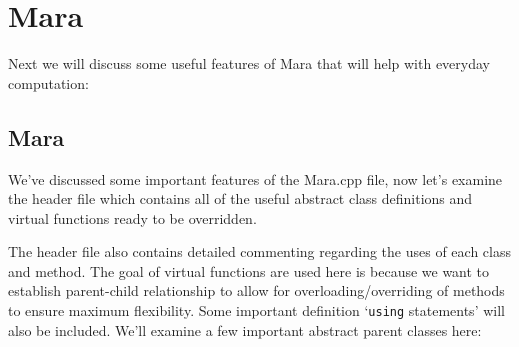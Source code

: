 \documentclass{article}
\begin{document}
\section{Mara}
Next we will discuss some useful features of Mara that will help with everyday computation:

\subsection{Mara}
We've discussed some important features of the Mara.cpp file, now let's examine the header file which contains all of the useful abstract class definitions and virtual functions ready to be overridden. 

The header file also contains detailed commenting regarding the uses of each class and method. The goal of virtual functions are used here is because we want to establish parent-child relationship to allow for overloading/overriding of methods to ensure maximum flexibility. Some important definition `\texttt{using} statements' will also be included. We'll examine a few important abstract parent classes here:
\end{document}
